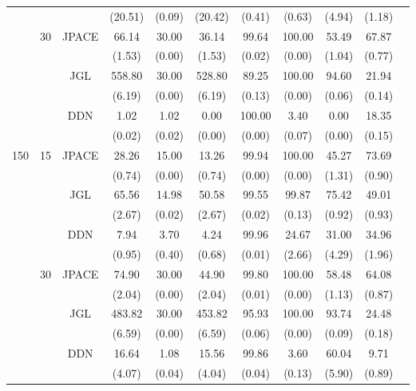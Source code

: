 \documentclass[useAMS,usenatbib,referee]{bio}
\begin{document}
{\begin{table}[htb!]
{\begin{tabular}{||c|c|c||c|c|c|c|c|c|c||c}
 & & & (20.51) & (0.09) & (20.42) & (0.41) & (0.63) & (4.94) & (1.18) \\\cline{2-10} 
  &\multirow{6}{*}{30}  & \multirow{2}{*}{JPACE} &66.14 & 30.00 & 36.14 & 99.64 & 100.00 & 53.49 & 67.87 \\ 
& & & (1.53) & (0.00) & (1.53) & (0.02) & (0.00) & (1.04) & (0.77) \\ \cline{3-10} 
& & \multirow{2}{*}{JGL} & 558.80 & 30.00 & 528.80 & 89.25 & 100.00 & 94.60 & 21.94 \\ 
 & & & (6.19) & (0.00) & (6.19) & (0.13) & (0.00) & (0.06) & (0.14) \\ \cline{3-10} 
& & \multirow{2}{*}{DDN} & 1.02 & 1.02 & 0.00 & 100.00 & 3.40 & 0.00 & 18.35 \\ 
 & & & (0.02) & (0.02) & (0.00) & (0.00) & (0.07) & (0.00) & (0.15) \\\cline{1-10} 
\multirow{12}{*}{150}  &\multirow{6}{*}{15}  & \multirow{2}{*}{JPACE} &28.26 & 15.00 & 13.26 & 99.94 & 100.00 & 45.27 & 73.69 \\ 
& & & (0.74) & (0.00) & (0.74) & (0.00) & (0.00) & (1.31) & (0.90) \\ \cline{3-10} 
& & \multirow{2}{*}{JGL} & 65.56 & 14.98 & 50.58 & 99.55 & 99.87 & 75.42 & 49.01 \\ 
 & & & (2.67) & (0.02) & (2.67) & (0.02) & (0.13) & (0.92) & (0.93) \\ \cline{3-10} 
& & \multirow{2}{*}{DDN} & 7.94 & 3.70 & 4.24 & 99.96 & 24.67 & 31.00 & 34.96 \\ 
 & & & (0.95) & (0.40) & (0.68) & (0.01) & (2.66) & (4.29) & (1.96) \\\cline{2-10} 
  &\multirow{6}{*}{30}  & \multirow{2}{*}{JPACE} &74.90 & 30.00 & 44.90 & 99.80 & 100.00 & 58.48 & 64.08 \\ 
& & & (2.04) & (0.00) & (2.04) & (0.01) & (0.00) & (1.13) & (0.87) \\ \cline{3-10} 
& & \multirow{2}{*}{JGL} & 483.82 & 30.00 & 453.82 & 95.93 & 100.00 & 93.74 & 24.48 \\ 
 & & & (6.59) & (0.00) & (6.59) & (0.06) & (0.00) & (0.09) & (0.18) \\ \cline{3-10} 
& & \multirow{2}{*}{DDN} & 16.64 & 1.08 & 15.56 & 99.86 & 3.60 & 60.04 & 9.71 \\ 
 & & & (4.07) & (0.04) & (4.04) & (0.04) & (0.13) & (5.90) & (0.89) \\\cline{1-10} 

\end{tabular}
}
\end{table}





}
\end{document}
